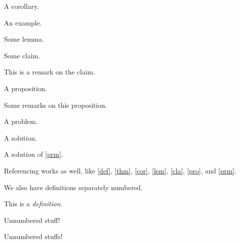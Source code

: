 \documentclass{article}
\begin{document}
\begin{corollary}
    \label{cor}%
    A corollary. \lipsum[7]
\end{corollary}

\begin{example}[An example]
    An example. \lipsum[8]
\end{example}

\begin{lemma}
    \label{lem}%
    Some lemma. \lipsum[9]
\end{lemma}

\begin{claim}
    \label{cla}%
    Some claim. \lipsum[10]
\end{claim}

\begin{remark}
    This is a remark on the claim. \lipsum[11]
\end{remark}

\begin{proposition}
    \label{pro}%
    A proposition. \lipsum[12]
\end{proposition}

\begin{remarks}
    Some remarks on this proposition. \lipsum[13]
\end{remarks}

\begin{problem}
    \label{prm}%
    A problem. \lipsum[14]
\end{problem}

\begin{solution}
    A solution. \lipsum[15]
\end{solution}

\begin{solution}
    A solution of \autoref{prm}. \lipsum[16]
\end{solution}

Referencing works as well, like \autoref{def}, \autoref{thm}, \autoref{cor}, \autoref{lem}, \autoref{cla}, \autoref{pro}, and \autoref{prm}.

We also have definitions separately numbered.

\begin{definition*}
    \label{defs}%
    This is a \emph{definition}. \lipsum[1]
\end{definition*}

\begin{example*}
    Unnumbered stuff! \lipsum[17]
\end{example*}

\begin{examples*}
    Unnumbered stuffs! \lipsum[18]
\end{examples*}
\end{document}
